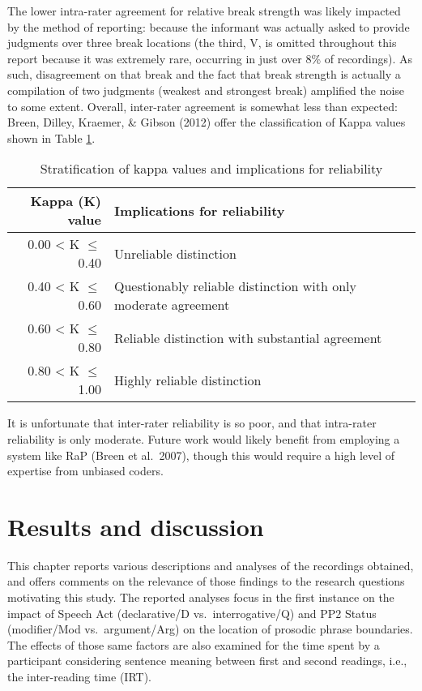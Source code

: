 \documentclass[11pt,oneside]{book}
\begin{document}
The lower intra-rater agreement for relative break strength was likely impacted by the method of reporting: because the informant was actually asked to provide judgments over three break locations (the third, V, is omitted throughout this report because it was extremely rare, occurring in just over 8\% of recordings). As such, disagreement on that break and the fact that break strength is actually a compilation of two judgments (weakest and strongest break) amplified the noise to some extent. Overall, inter-rater agreement is somewhat less than expected: Breen, Dilley, Kraemer, \& Gibson (2012) offer the classification of Kappa values shown in Table \ref{tab:agreements}.

\begin{table}[!h]

\caption{\label{tab:agreements}Stratification of kappa values and implications for reliability}
\centering
\begin{tabular}{rlrl}
\toprule
Kappa (K) value & Implications for reliability\\
\midrule
0.00 < K $\leq$ 0.40 & Unreliable distinction\\
0.40 < K $\leq$ 0.60 & Questionably reliable distinction with only moderate agreement\\
0.60 < K $\leq$ 0.80 & Reliable distinction with substantial agreement\\
0.80 < K $\leq$ 1.00 & Highly reliable distinction\\
\bottomrule
\end{tabular}
\end{table}

It is unfortunate that inter-rater reliability is so poor, and that intra-rater reliability is only moderate. Future work would likely benefit from employing a system like RaP (Breen et al.~2007), though this would require a high level of expertise from unbiased coders.

\hypertarget{res}{%
\chapter{Results and discussion}\label{res}}

\setlength\parindent{24pt}\setlength{\parskip}{0.0pt plus 1.0pt}

This chapter reports various descriptions and analyses of the recordings obtained, and offers comments on the relevance of those findings to the research questions motivating this study. The reported analyses focus in the first instance on the impact of Speech Act (declarative/D vs.~interrogative/Q) and PP2 Status (modifier/Mod vs.~argument/Arg) on the location of prosodic phrase boundaries. The effects of those same factors are also examined for the time spent by a participant considering sentence meaning between first and second readings, i.e., the inter-reading time (IRT).
\end{document}
